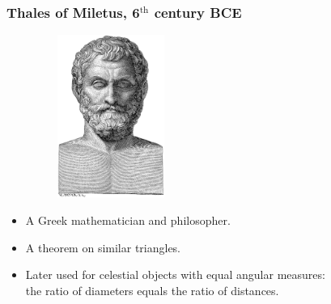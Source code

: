 \documentclass[aspectratio=169,xcolor=pdftex,dvipsnames]{beamer} %
\begin{document}
\begin{frame}
\frametitle{Thales of Miletus, 6$^{\text{th}}$ century BCE}

 \ \ \ \  \ \ \ \ \ 
\includegraphics[width=35mm]{thales.jpg}

\begin{itemize}
\item
A Greek mathematician and philosopher.
\item
A theorem on similar triangles.
\item
Later used for celestial objects with equal angular measures:\\
the ratio of diameters equals the ratio of distances.
\end{itemize}

\end{frame}
\end{document}

